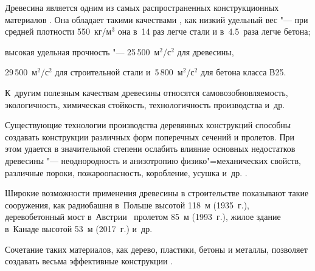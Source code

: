 
\date{}








\renewcommand{\JournalDataOnline}{\displaydate{nemirove}}



\makerutitle






Древесина является одним из самых распространенных конструкционных материалов  \cite{Arleninov, Shmidt, Porteous}. Она обладает такими качествами \cite{Arleninov}, как низкий удельный вес "---  при средней плотности 550~кг/м$^3$ она в~14 раз легче стали и в~4.5~раза легче бетона; 

высокая удельная прочность "---  25\,500~м$^2$/с$^2$ для древесины, 

29\,500~м$^2$/с$^2$ для строительной стали и~5\,800~м$^2$/с$^2$ для бетона класса В25. 

К~другим полезным качествам древесины относятся самовозобновляемость, экологичность, химическая стойкость, технологичность производства и~др.



Существующие технологии производства деревянных конструкций способны создавать конструкции различных форм поперечных сечений и пролетов. При этом удается в значительной степени ослабить влияние основных недостатков древесины "---  неоднородность и анизотропию физико"=механических свойств, различные пороки, пожароопасность, коробление, усушка и~др. \cite{Arleninov, Porteous}. 



Широкие возможности применения древесины в строительстве показывают такие сооружения, как радиобашня в~Польше высотой 118~м (1935~г.), деревобетонный мост в~Австрии~\cite{Pischl} пролетом 85~м (1993~г.), жилое здание в~Канаде \cite{Poirier} высотой 53~м (2017~г.) и~др.



Сочетание таких материалов, как дерево, пластики, бетоны и металлы,  позволяет создавать весьма эффективные конструкции  \cite{Stoianov,Woodconcretbridge}.



